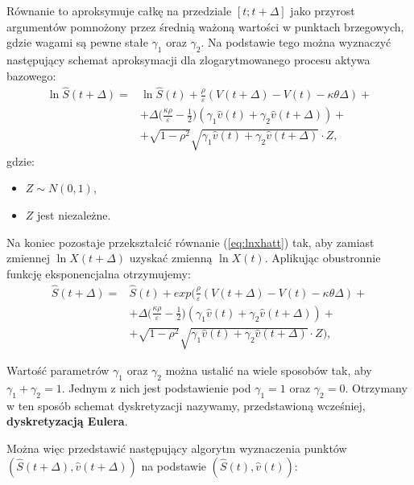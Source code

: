 \documentclass{pracamgr}
\begin{document}
Równanie to aproksymuje całkę na przedziale $[t; t + \Delta]$ 
jako przyrost argumentów pomnożony przez średnią ważoną wartości w punktach brzegowych, gdzie wagami 
są pewne stałe $\gamma_1$ oraz $\gamma_2$. Na podstawie tego można wyznaczyć 
następujący schemat aproksymacji dla zlogarytmowanego procesu aktywa bazowego:
\begin{equation}
\begin{aligned}
\label{eq:lnxhatt}
\ln \hat{S}(t + \Delta) = & \ln \hat{S}(t)  + \frac{\rho}{\varepsilon} (V(t + \Delta)  - V(t) - \kappa \theta \Delta) + \\
& + \Delta \Big( \frac{\kappa \rho}{\varepsilon} - \frac{1}{2} \Big) (\gamma_1 \hat{v}(t) + \gamma_2 \hat{v}(t + \Delta)) + \\
& + \sqrt{1-\rho^2} \sqrt{\gamma_1 \hat{v}(t) + \gamma_2 \hat{v}(t + \Delta)} \cdot Z,
\end{aligned}
\end{equation}
gdzie: 
\begin{itemize}
  \item $Z \sim N(0,1)$,
  \item $Z$ jest niezależne.
\end{itemize}

Na koniec pozostaje przekształcić równanie (\ref{eq:lnxhatt}) tak, aby zamiast 
zmiennej $\ln X(t + \Delta)$ uzyskać zmienną $\ln X(t)$. Aplikując obustronnie
funkcję eksponencjalna otrzymujemy:
\begin{equation}
\begin{aligned}
\label{eq:xhatt}
\hat{S}(t + \Delta) = & \hat{S}(t)  + exp(\frac{\rho}{\varepsilon} 
(V(t + \Delta)  - V(t) - \kappa \theta \Delta) + \\
& + \Delta \Big( \frac{\kappa \rho}{\varepsilon} - 
\frac{1}{2} \Big) (\gamma_1 \hat{v}(t) + \gamma_2 \hat{v}(t + \Delta)) + \\
& + \sqrt{1-\rho^2} \sqrt{\gamma_1 \hat{v}(t) + \gamma_2 \hat{v}(t + \Delta)} \cdot Z),
\end{aligned}
\end{equation}


Wartość parametrów $\gamma_1$ oraz $\gamma_2$ można ustalić na wiele 
sposobów tak, aby $\gamma_1 + \gamma_2 = 1$. 
Jednym z nich jest podstawienie pod $\gamma_1 = 1$ oraz $\gamma_2 = 0$. Otrzymany w ten sposób 
schemat dyskretyzacji nazywamy, przedstawioną wcześniej, \textbf{dyskretyzacją Eulera}.

Można więc przedstawić następujący algorytm wyznaczenia punktów 
$(\hat{S}(t+ \Delta), \hat{v}(t+ \Delta))$ na podstawie $(\hat{S}(t), \hat{v}(t))$:
 
\end{document}
